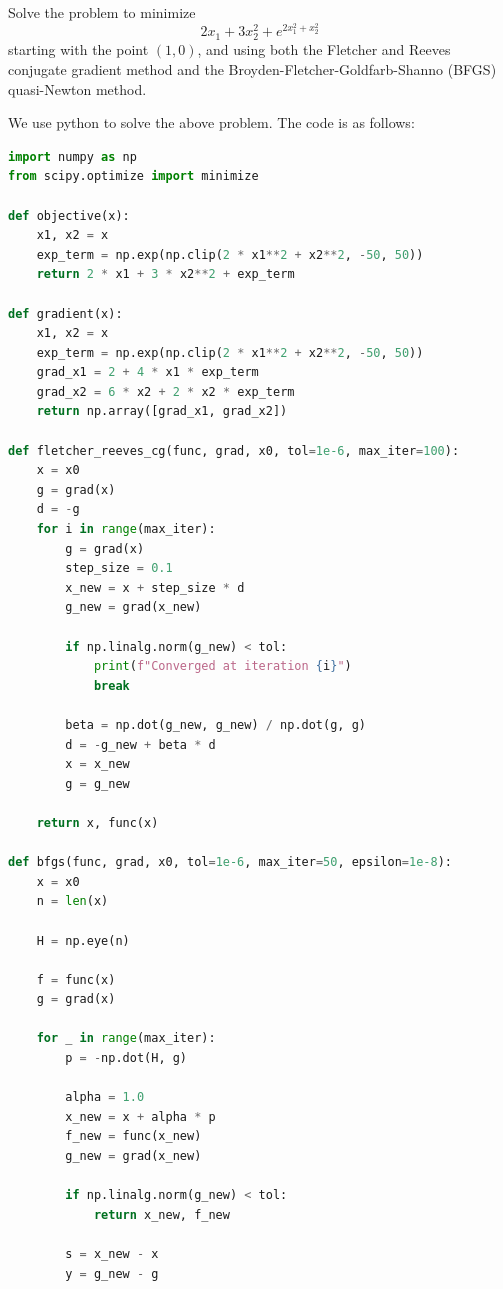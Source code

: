 \documentclass{article}
\begin{document}

\begin{question*}[5]
    Solve the problem to minimize 
    \[
    2x_1 + 3x_2^2 + e^{2x_1^2 + x_2^2}
    \]
    starting with the point \( (1, 0) \), and using both the Fletcher and Reeves conjugate gradient method and the Broyden-Fletcher-Goldfarb-Shanno (BFGS) quasi-Newton method.
\end{question*}

We use python to solve the above problem. The code is as follows:

\begin{lstlisting}[language=Python]
import numpy as np
from scipy.optimize import minimize

def objective(x):
    x1, x2 = x
    exp_term = np.exp(np.clip(2 * x1**2 + x2**2, -50, 50))
    return 2 * x1 + 3 * x2**2 + exp_term

def gradient(x):
    x1, x2 = x
    exp_term = np.exp(np.clip(2 * x1**2 + x2**2, -50, 50)) 
    grad_x1 = 2 + 4 * x1 * exp_term
    grad_x2 = 6 * x2 + 2 * x2 * exp_term
    return np.array([grad_x1, grad_x2])

def fletcher_reeves_cg(func, grad, x0, tol=1e-6, max_iter=100):
    x = x0
    g = grad(x)  
    d = -g  
    for i in range(max_iter):
        g = grad(x)
        step_size = 0.1 
        x_new = x + step_size * d
        g_new = grad(x_new)
        
        if np.linalg.norm(g_new) < tol:
            print(f"Converged at iteration {i}")
            break
        
        beta = np.dot(g_new, g_new) / np.dot(g, g)
        d = -g_new + beta * d
        x = x_new
        g = g_new
        
    return x, func(x)

def bfgs(func, grad, x0, tol=1e-6, max_iter=50, epsilon=1e-8):
    x = x0
    n = len(x)
    
    H = np.eye(n)
    
    f = func(x)
    g = grad(x)
    
    for _ in range(max_iter):
        p = -np.dot(H, g)
        
        alpha = 1.0
        x_new = x + alpha * p
        f_new = func(x_new)
        g_new = grad(x_new)
        
        if np.linalg.norm(g_new) < tol:
            return x_new, f_new
        
        s = x_new - x
        y = g_new - g
        

\end{lstlisting}
\end{document}
